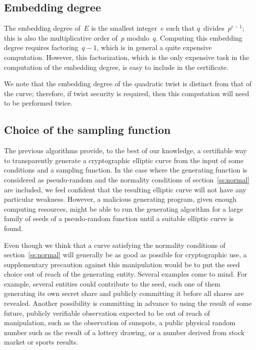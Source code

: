\documentclass[twocolumn,letterpaper,10pt]{article}
\begin{document}
\subsection{Embedding degree}

The embedding degree of~$E$ is the smallest integer~$e$
such that $q$~divides~$p^{e-1}$;
this is also the multiplicative order of~$p$ modulo~$q$.
Computing this embedding degree requires factoring~$q-1$,
which is in general a quite expensive computation.
However, this factorization, which is the only expensive task
in the computation of the embedding degree,
is easy to include in the certificate.

We note that the embedding degree of the quadratic twist
is distinct from that of the curve;
therefore, if twist security is required,
then this computation will need to be performed twice.

\subsection{Choice of the sampling function}

The previous algorithms provide, to the best of our knowledge,
a certifiable way to transparently generate a cryptographic elliptic curve
from the input of some conditions and a sampling function.
In the case where the generating function is considered as pseudo-random
and the normality conditions of section~\ref{ss:normal} are included,
we feel confident that the resulting elliptic curve
will not have any particular weakness.
However, a malicious generating program, given enough computing resources,
might be able to run the generating algorithm
for a large family of seeds of a pseudo-random function
until a suitable elliptic curve is found.

Even though we think that a curve satisfying the normality conditions
of section~\ref{ss:normal} will generally be as good as possible
for cryptographic use,
a supplementary precaution against this manipulation
would be to put the seed choice out of reach of the generating entity.
Several examples come to mind.
For example, several entities could contribute to the seed,
each one of them generating its own secret share
and publicly committing it before all shares are revealed.
Another possibility is committing in advance to using
the result of some future, publicly verifiable observation
expected to be out of reach of manipulation,
such as the observation of sunspots,
a public physical random number such as the result of a lottery drawing,
or a number derived from stock market or sports results.
\end{document}
